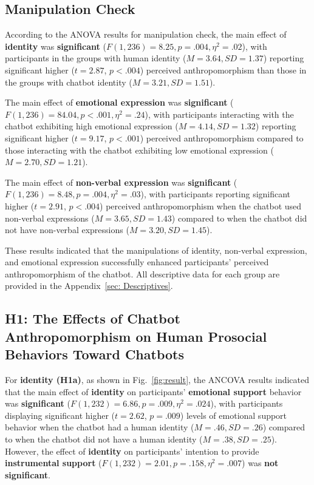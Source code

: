 \subsection{Manipulation Check}
\label{sec:manipulation-check}

According to the ANOVA results for manipulation check, the main effect of \textbf{identity} was \textbf{significant} (\(F(1, 236) = 8.25, p = .004, \eta^2 = .02 \)), with participants in the groups with human identity (\(M = 3.64, SD = 1.37 \)) reporting significant higher ($t=2.87$, $p<.004$) perceived anthropomorphism than those in the groups with chatbot identity (\(M = 3.21, SD = 1.51 \)).

The main effect of \textbf{emotional expression} was \textbf{significant} (\(F(1, 236) = 84.04, p < .001, \eta^2 = .24 \)), with participants interacting with the chatbot exhibiting high emotional expression (\(M = 4.14, SD = 1.32 \)) reporting significant higher ($t=9.17$, $p<.001$) perceived anthropomorphism compared to those interacting with the chatbot exhibiting low emotional expression (\(M = 2.70, SD = 1.21 \)).

The main effect of \textbf{non-verbal expression} was \textbf{significant} (\(F(1, 236) = 8.48, p = .004, \eta^2 = .03 \)), with participants reporting significant higher ($t=2.91$, $p<.004$) perceived anthropomorphism when the chatbot used non-verbal expressions (\(M = 3.65, SD = 1.43 \)) compared to when the chatbot did not have non-verbal expressions (\(M = 3.20, SD = 1.45 \)). 

These results indicated that the manipulations of identity, non-verbal expression, and emotional expression successfully enhanced participants' perceived anthropomorphism of the chatbot. All descriptive data for each group are provided in the Appendix~\ref{sec: Descriptives}.




\subsection{H1: The Effects of Chatbot Anthropomorphism on Human Prosocial Behaviors Toward Chatbots}
\label{sec:H1}
For \textbf{identity (H1a)}, as shown in Fig.~\ref{fig:result}, the ANCOVA results indicated that the main effect of \textbf{identity} on participants' \textbf{emotional support} behavior was \textbf{significant} (\(F(1, 232) = 6.86, p = .009, \eta^2 = .024 \)), with participants displaying significant higher ($t=2.62$, $p = .009$) levels of emotional support behavior when the chatbot had a human identity (\(M = .46, SD = .26 \)) compared to when the chatbot did not have a human identity (\(M = .38, SD = .25 \)). 
However, the effect of \textbf{identity} on participants' intention to provide \textbf{instrumental support} (\(F(1, 232) = 2.01, p =.158, \eta^2 = .007 \)) was \textbf{not significant}.


